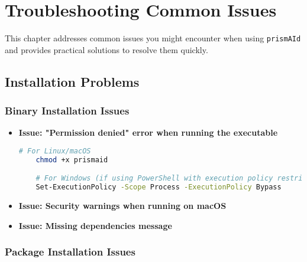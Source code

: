 \chapter{Troubleshooting Common Issues} \label{chap:troubleshooting}

This chapter addresses common issues you might encounter when using \texttt{prismAId} and provides practical solutions to resolve them quickly.

\section{Installation Problems}

\subsection{Binary Installation Issues}

\begin{itemize}
    \item \textbf{Issue: "Permission denied" error when running the executable}

    \begin{commandbox}
    \begin{lstlisting}[language=Bash]
    # For Linux/macOS
    chmod +x prismaid

    # For Windows (if using PowerShell with execution policy restrictions)
    Set-ExecutionPolicy -Scope Process -ExecutionPolicy Bypass
    \end{lstlisting}
    \end{commandbox}

    \item \textbf{Issue: Security warnings when running on macOS}


    \item \textbf{Issue: Missing dependencies message}

\end{itemize}

\subsection{Package Installation Issues}

